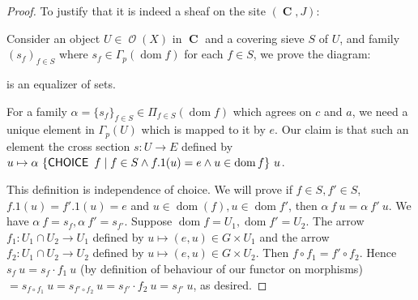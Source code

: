 \documentclass[a4paper]{article}
\DeclareMathOperator{\C}{\mathbf {C}}
\DeclareMathOperator{\Et}{\text {Etale}}
\DeclareMathOperator{\mcO}{\mathcal {O}}
\DeclareMathOperator{\CHOICE}{\sf CHOICE}
\DeclareMathOperator{\dom}{\text {dom}}
\DeclareMathOperator{\cod}{\text {cod}}
\begin{document}
\begin{proof}

    To justify that it is indeed a sheaf on the site $(\C,J)$:

    Consider an object $U\in \mcO(X)$ in $\C$ and a covering sieve $S$ of $U$, and family $(s_{f})_{f\in S}$ where $s_f\in \Gamma_p(\dom f)$ for each $f\in S$, we prove the diagram:
    \begin{center}
    \end{center}

    is an equalizer of sets. 

    
    
    
    
    For a family $\alpha=\{s_f\}_{f\in S}\in \Pi_{f\in S}(\dom f)$ which agrees on $c$ and $a$, we need a unique element in $\Gamma_p(U)$ which is mapped to it by $e$. Our claim is that such an element the cross section $s:U\to E$ defined by $u\mapsto \alpha \ \{\CHOICE \ f\mid f\in S\land f.1(u)=e\land u\in \dom f\} \ u$. 

    This definition is independence of choice. We will prove if $f\in S,f'\in S$, $f.1(u)=f'.1(u)=e$ and $u\in \dom (f),u\in \dom f'$, then $\alpha \ f \ u = \alpha \ f' \ u$. We have $\alpha\ f = s_f,\alpha \ f'=s_{f'}$. Suppose $\dom f = U_1,\dom f' = U_2$. The arrow $f_1:U_1\cap U_2\to U_1$ defined by $u\mapsto (e,u)\in G\times U_1$ and the arrow $f_2:U_1\cap U_2\to U_2$ defined by $u\mapsto (e,u)\in G\times U_2$. Then $f\circ f_1=f'\circ f_2$. Hence $s_f\ u = s_f\cdot f_1\ u$ (by definition of behaviour of our functor on morphisms) $=s_{f\circ f_1}\ u = s_{f'\circ f_2}\ u = s_{f'}\cdot f_2\ u= s_{f'}\ u$, as desired.


\end{proof}
\end{document}

